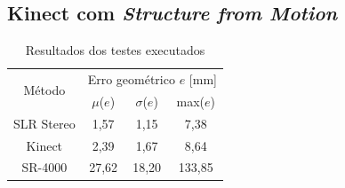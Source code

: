 \documentclass[table, usenames, svgnames, xcolor=dvipsnames]{beamer}
\begin{document}
\subsection{Kinect com \protect\emph{Structure from Motion}}
\begin{frame}
	\begin{center}
		\begin{table}[htbp]
\caption{Resultados dos testes executados}
\label{tab:resultadosKinect}
\begin{center}
\begin{tabular}{|c|c|c|c|}
\hline
\multirow{2}{1.5cm}{Método}& \multicolumn{3}{p{5cm}|}{Erro geométrico $e$ [mm]} \bigstrut \\
\cline{2-4} & \multicolumn{1}{c|}{$\mu$($e$)} & \multicolumn{1}{c|}{$\sigma$($e$)} & \multicolumn{1}{c|}{max($e$)} \bigstrut \\ \hline
SLR Stereo & 1,57 & 1,15 & 7,38 \bigstrut \\ \hline
Kinect & 2,39 & 1,67 & 8,64 \bigstrut \\ \hline
SR-4000 & 27,62 & 18,20 & 133,85 \bigstrut \\ 
\hline
\end{tabular}
\end{center}
\end{table}
	\end{center}
\end{frame}
\end{document}
